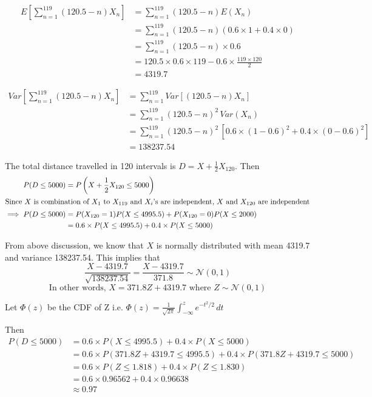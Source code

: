 \documentclass[12pt, oneside]{article}
\begin{document}
\begin{enumerate}
{    \begin{align*}
        E\left[\sum_{n = 1}^{119} (120.5 - n) X_n\right] &= \sum_{n = 1}^{119} (120.5 - n) E(X_n) \\
            &= \sum_{n = 1}^{119} (120.5 - n) (0.6 \times 1 + 0.4 \times 0) \\
            &= \sum_{n = 1}^{119} (120.5 - n) \times 0.6 \\
            &= 120.5 \times 0.6 \times 119 - 0.6 \times \frac{119 \times 120}{2} \\
            &= 4319.7
    \end{align*}

    \begin{align*}
        Var\left[\sum_{n = 1}^{119} (120.5 - n) X_n\right]
            &= \sum_{n = 1}^{119} Var\left[(120.5 - n) X_n\right] \tag*{(As the rv's are independent)} \\
            &= \sum_{n = 1}^{119} (120.5 - n)^2 \, Var(X_n) \\
            &= \sum_{n = 1}^{119} (120.5 - n)^2 \, [0.6 \times (1 - 0.6)^2 + 0.4 \times (0 - 0.6)^2] \\
            &= 138237.54
    \end{align*}

    The total distance travelled in 120 intervals is \(D = X + \frac{1}{2} X_{120}\). Then 
    \begin{align*}
        P(D \leq 5000) &= P\left(X + \frac{1}{2} X_{120} \leq 5000\right) \\
        \intertext{Since \(X\) is combination of \(X_1\) to \(X_{119}\) and \(X_{i}\)'s 
                    are independent, \(X\) and \(X_{120}\) are independent}
        \implies P(D \leq 5000) &= P(X_{120} = 1) P(X \leq 4995.5) + P(X_{120} = 0) P(X \leq 2000) \\
            &= 0.6 \times P(X \leq 4995.5) + 0.4 \times P(X \leq 5000)
    \end{align*}

    From above discussion, we know that \(X\) is normally distributed with mean 4319.7 
    and variance 138237.54. This implies that
    \[\frac{X - 4319.7}{\sqrt{138237.54}} = \frac{X - 4319.7}{371.8} \sim \mathcal{N}(0, 1)\]
    \[\text{In other words, } X = 371.8 Z + 4319.7 \text{ where } Z \sim \mathcal{N}(0, 1)\]

    Let \(\Phi(z)\) be the CDF of Z i.e. \(\Phi(z) = \frac{1}{\sqrt{2\pi}} \int_{-\infty}^{z} e^{-t^2/2} \,dt\)

    Then
    \begin{align*}
        P(D \leq 5000) &= 0.6 \times P(X \leq 4995.5) + 0.4 \times P(X \leq 5000) \\
            &= 0.6 \times P(371.8 Z + 4319.7 \leq 4995.5) + 0.4 \times P(371.8 Z + 4319.7 \leq 5000) \\
            &= 0.6 \times P(Z \leq 1.818) + 0.4 \times P(Z \leq 1.830) \\
            &= 0.6 \times 0.96562 + 0.4 \times 0.96638 \\
            &\approx 0.97
    \end{align*}

}
\end{enumerate}
\end{document}
